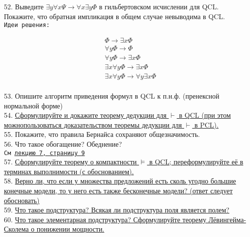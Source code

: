\documentclass[a4paper,100pt]{article}
\theoremstyle{indented}
\theoremstyle{definition}
\theoremstyle{remark}
\DeclareMathOperator{\ra}{\rightarrow}
\begin{document}
52. %
{Выведите $\exists y \forall x \Psi \ra \forall x \exists y \Phi$ в гильбертовском исчислении для QCL. Покажите, что обратная импликация в общем случае невыводима в QCL.} \\ 

\texttt{Идеи решения:}

\begin{align*}
  & \Phi\to \exists x \Phi\\
  & \forall y \Phi\to \Phi\\
  & \forall y \Phi\to \exists x\Phi\\
  & \exists x\forall y \Phi\to \exists x\Phi\\
  & \exists x\forall y \Phi\to \forall y \exists x\Phi\\
\end{align*}

53. %
{Опишите алгоритм приведения формул в QCL к п.н.ф. (пренексной нормальной форме)} \\ 

54. \hyperlink{b54}{Сформулируйте и докажите теорему дедукции для $\vdash$ в QCL (при этом можнопользоваться доказательством теоремы дедукции для $\vdash$ в PCL).} \\

55. %
{Покажите, что правила Бернайса сохраняют общезначимость.} \\ 

56. %
{Что такое обогащение? Обеднение?} \\ 

\texttt{См \href{http://www.mi-ras.ru/~speranski/courses/logic-1-2021-spring/slides_7.pdf}{лекцию 7, страницу 9}} \\

57. \hyperlink{b57}{Сформулируйте теорему о компактности $\vDash$ в QCL; переформулируйте её в терминах выполнимости (с обоснованием).} \\

58. \hyperlink{b58}{Верно ли, что если у множества предложений есть сколь угодно большие конечные модели, то у него есть также бесконечные модели? (ответ следует обосновать)} \\

59. \hyperlink{b59}{Что такое подструктура? Всякая ли подструктура поля является полем?} \\

60. \hyperlink{b60}{Что такое элементарная подструктура? Сформулируйте теорему Лёвингейма-Сколема о понижении мощности.} \\ 
\end{document}
